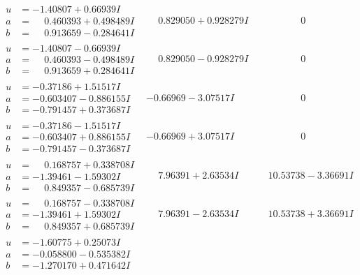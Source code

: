 \documentclass[1p]{elsarticle_modified}
\theoremstyle{definition}
\begin{document}
$$\begin{array}{c|c|c}
\begin{aligned}
u &= -1.40807 + 0.66939 I \\
a &= \phantom{-}0.460393 + 0.498489 I \\
b &= \phantom{-}0.913659 - 0.284641 I\end{aligned}
 & \phantom{-}0.829050 + 0.928279 I & \phantom{-0.000000 } 0 \\ \hline\begin{aligned}
u &= -1.40807 - 0.66939 I \\
a &= \phantom{-}0.460393 - 0.498489 I \\
b &= \phantom{-}0.913659 + 0.284641 I\end{aligned}
 & \phantom{-}0.829050 - 0.928279 I & \phantom{-0.000000 } 0 \\ \hline\begin{aligned}
u &= -0.37186 + 1.51517 I \\
a &= -0.603407 - 0.886155 I \\
b &= -0.791457 + 0.373687 I\end{aligned}
 & -0.66969 - 3.07517 I & \phantom{-0.000000 } 0 \\ \hline\begin{aligned}
u &= -0.37186 - 1.51517 I \\
a &= -0.603407 + 0.886155 I \\
b &= -0.791457 - 0.373687 I\end{aligned}
 & -0.66969 + 3.07517 I & \phantom{-0.000000 } 0 \\ \hline\begin{aligned}
u &= \phantom{-}0.168757 + 0.338708 I \\
a &= -1.39461 - 1.59302 I \\
b &= \phantom{-}0.849357 - 0.685739 I\end{aligned}
 & \phantom{-}7.96391 + 2.63534 I & \phantom{-}10.53738 - 3.36691 I \\ \hline\begin{aligned}
u &= \phantom{-}0.168757 - 0.338708 I \\
a &= -1.39461 + 1.59302 I \\
b &= \phantom{-}0.849357 + 0.685739 I\end{aligned}
 & \phantom{-}7.96391 - 2.63534 I & \phantom{-}10.53738 + 3.36691 I \\ \hline\begin{aligned}
u &= -1.60775 + 0.25073 I \\
a &= -0.058800 - 0.535382 I \\
b &= -1.270170 + 0.471642 I\end{aligned}

\end{array}$$
\end{document}
